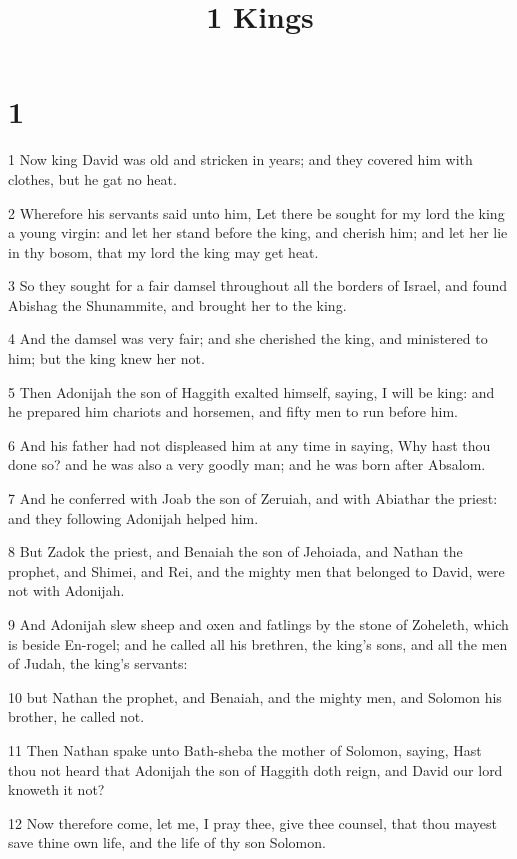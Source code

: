 

\title{1 Kings}

\chapter{1}

\par 1 Now king David was old and stricken in years; and they covered him with clothes, but he gat no heat.
\par 2 Wherefore his servants said unto him, Let there be sought for my lord the king a young virgin: and let her stand before the king, and cherish him; and let her lie in thy bosom, that my lord the king may get heat.
\par 3 So they sought for a fair damsel throughout all the borders of Israel, and found Abishag the Shunammite, and brought her to the king.
\par 4 And the damsel was very fair; and she cherished the king, and ministered to him; but the king knew her not.
\par 5 Then Adonijah the son of Haggith exalted himself, saying, I will be king: and he prepared him chariots and horsemen, and fifty men to run before him.
\par 6 And his father had not displeased him at any time in saying, Why hast thou done so? and he was also a very goodly man; and he was born after Absalom.
\par 7 And he conferred with Joab the son of Zeruiah, and with Abiathar the priest: and they following Adonijah helped him.
\par 8 But Zadok the priest, and Benaiah the son of Jehoiada, and Nathan the prophet, and Shimei, and Rei, and the mighty men that belonged to David, were not with Adonijah.
\par 9 And Adonijah slew sheep and oxen and fatlings by the stone of Zoheleth, which is beside En-rogel; and he called all his brethren, the king's sons, and all the men of Judah, the king's servants:
\par 10 but Nathan the prophet, and Benaiah, and the mighty men, and Solomon his brother, he called not.
\par 11 Then Nathan spake unto Bath-sheba the mother of Solomon, saying, Hast thou not heard that Adonijah the son of Haggith doth reign, and David our lord knoweth it not?
\par 12 Now therefore come, let me, I pray thee, give thee counsel, that thou mayest save thine own life, and the life of thy son Solomon.
